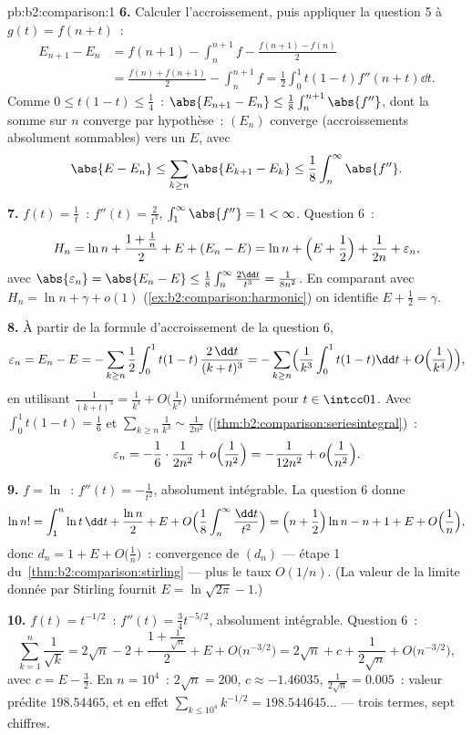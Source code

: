 \begin{solution}{pb:b2:comparison:1}
\textbf{6.} Calculer l'accroissement, puis appliquer la question 5 à
$g(t) = f(n + t)$~:
\begin{align*}
E_{n+1} - E_n
&= f(n{+}1) - \int_n^{n+1}\!f - \frac{f(n{+}1) - f(n)}2 \\
&= \frac{f(n) + f(n{+}1)}2 - \int_n^{n+1}\!f
= \frac12\int_0^1 t(1-t)f''(n+t)\dd t .
\end{align*}
Comme $0 \leq t(1-t) \leq \frac14$~: $\abs{E_{n+1} - E_n} \leq
\frac18\int_n^{n+1}\abs{f''}$, dont la somme sur $n$ converge par
hypothèse~: $(E_n)$ converge (accroissements absolument sommables)
vers un $E$, avec
\[
\abs{E - E_n} \leq \sum_{k\geq n}\abs{E_{k+1} - E_k} \leq
\frac18\int_n^\infty\abs{f''} .
\]

\textbf{7.} $f(t) = \frac1t$~: $f''(t) = \frac2{t^3}$,
$\int_1^\infty\abs{f''} = 1 < \infty$. Question 6~:
\[
H_n = \ln n + \frac{1 + \frac1n}{2} + E + (E_n - E)
= \ln n + \Bigl(E + \frac12\Bigr) + \frac1{2n} +
\varepsilon_n,
\]
avec $\abs{\varepsilon_n} = \abs{E_n - E} \leq
\frac18\int_n^\infty\frac{2\dd t}{t^3} = \frac1{8n^2}$.
En comparant avec $H_n = \ln n + \gamma + o(1)$
(\cref{ex:b2:comparison:harmonic}) on identifie $E + \frac12 =
\gamma$.

\textbf{8.} À partir de la formule d'accroissement de la question 6,
\[
\varepsilon_n = E_n - E = -\sum_{k\geq n}\frac12\int_0^1
t(1-t)\,\frac{2\,\dd t}{(k+t)^3}
= -\sum_{k \geq n}\Bigl(\frac1{k^3}\int_0^1t(1-t)\dd t +
O\Bigl(\frac1{k^4}\Bigr)\Bigr),
\]
en utilisant $\frac{1}{(k+t)^3} = \frac1{k^3} +
O\bigl(\frac1{k^4}\bigr)$ uniformément pour $t \in \intcc01$. Avec
$\int_0^1 t(1-t) = \frac16$ et
$\sum_{k\geq n}\frac1{k^3} \sim \frac{1}{2n^2}$
(\cref{thm:b2:comparison:seriesintegral})~:
\[
\varepsilon_n = -\frac16\cdot\frac{1}{2n^2} +
o\Bigl(\frac1{n^2}\Bigr) = -\frac{1}{12n^2} +
o\Bigl(\frac{1}{n^2}\Bigr).
\]

\textbf{9.} $f = \ln$~: $f''(t) = -\frac1{t^2}$, absolument
intégrable. La question 6 donne
\[
\ln n! = \int_1^n\ln t\,\dd t + \frac{\ln n}2 + E + O\Bigl(
\frac1{8}\int_n^\infty\frac{\dd t}{t^2}\Bigr)
= \Bigl(n + \frac12\Bigr)\ln n - n + 1 + E +
O\Bigl(\frac1n\Bigr),
\]
donc $d_n = 1 + E + O\bigl(\frac1n\bigr)$~: convergence de $(d_n)$
--- étape 1 du~\cref{thm:b2:comparison:stirling} --- plus le
taux $O(1/n)$. (La valeur de la limite donnée par Stirling fournit $E =
\ln\sqrt{2\pi} - 1$.)

\textbf{10.} $f(t) = t^{-1/2}$~: $f''(t) = \frac34 t^{-5/2}$,
absolument intégrable. Question 6~:
\[
\sum_{k=1}^n \frac1{\sqrt k}
= 2\sqrt n - 2 + \frac{1 + \frac1{\sqrt n}}2 + E +
O\bigl(n^{-3/2}\bigr)
= 2\sqrt n + c + \frac{1}{2\sqrt n} +
O\bigl(n^{-3/2}\bigr),
\]
avec $c = E - \frac32$. En $n = 10^4$~: $2\sqrt n = 200$, $c
\approx -1.46035$, $\frac1{2\sqrt n} = 0.005$~: valeur prédite
$198.54465$, et en effet $\sum_{k\leq10^4}k^{-1/2} =
198.544645\dots$ --- trois termes, sept chiffres.


\end{solution}
